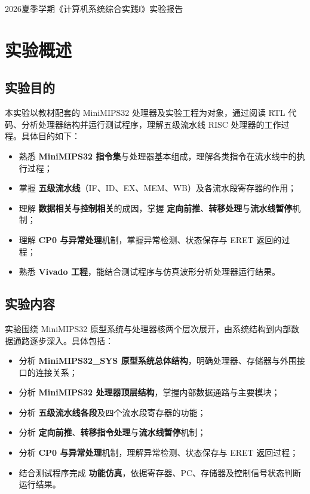 \documentclass[UTF8,a4paper,12pt,fontset=none]{ctexart}
\newcommand{\ReportTitle}{2026夏季学期《计算机系统综合实践Ⅰ》实验报告}
\newcommand{\heiti}{\CJKfamily{zhhei}}
\numberwithin{figure}{section}
\numberwithin{table}{section}
\begin{document}
\clearpage
{}
\setcounter{page}{1}
\hypersetup{pageanchor=true}
\pagestyle{main}

\begin{center}
  {\heiti{}\ReportTitle\par}
\end{center}
\vspace{0.5em}

\section{实验概述}
\subsection{实验目的}

本实验以教材配套的 MiniMIPS32 处理器及实验工程为对象，通过阅读 RTL 代码、分析处理器结构并运行测试程序，理解五级流水线 RISC 处理器的工作过程。具体目的如下：

\begin{itemize}
  \item 熟悉 \textbf{MiniMIPS32 指令集}与处理器基本组成，理解各类指令在流水线中的执行过程；
  \item 掌握 \textbf{五级流水线}（IF、ID、EX、MEM、WB）及各流水段寄存器的作用；
  \item 理解 \textbf{数据相关与控制相关}的成因，掌握 \textbf{定向前推}、\textbf{转移处理}与\textbf{流水线暂停}机制；
  \item 理解 \textbf{CP0 与异常处理}机制，掌握异常检测、状态保存与 ERET 返回的过程；
  \item 熟悉 \textbf{Vivado 工程}，能结合测试程序与仿真波形分析处理器运行结果。
\end{itemize}

\subsection{实验内容}

实验围绕 MiniMIPS32 原型系统与处理器核两个层次展开，由系统结构到内部数据通路逐步深入。具体包括：

\begin{itemize}
  \item 分析 \textbf{MiniMIPS32\_SYS 原型系统总体结构}，明确处理器、存储器与外围接口的连接关系；
  \item 分析 \textbf{MiniMIPS32 处理器顶层结构}，掌握内部数据通路与主要模块；
  \item 分析 \textbf{五级流水线各段}及四个流水段寄存器的功能；
  \item 分析 \textbf{定向前推}、\textbf{转移指令处理}与\textbf{流水线暂停}机制；
  \item 分析 \textbf{CP0 与异常处理}机制，理解异常检测、状态保存与 ERET 返回过程；
  \item 结合测试程序完成 \textbf{功能仿真}，依据寄存器、PC、存储器及控制信号状态判断运行结果。
\end{itemize}
\end{document}
